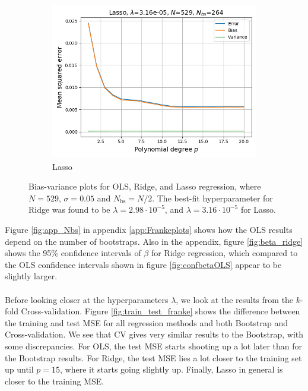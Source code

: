 \documentclass[a4paper]{article}
\begin{document}
\begin{figure}[H]
\begin{subfigure}{0.49\textwidth}
    \includegraphics[scale=0.45]{../figures/task_e/bias_variance_N529_pmax20_nlamb15_noise0.05_seed4155_Lasso_boot_Nbs264_opt1.png}
    \caption{Lasso}
  \end{subfigure}
  \caption{Bias-variance plots for OLS, Ridge, and Lasso regression, where $N=529$, $\sigma = 0.05$ and $N_{\text{bs}} = N/2$. The best-fit hyperparameter for Ridge was found to be $\lambda = 2.98\cdot10^{-5}$, and $\lambda = 3.16\cdot10^{-5}$ for Lasso.}
  \label{fig:bias_var}
\end{figure}
Figure \ref{fig:app_Nbs} in appendix \ref{app:Frankeplots} shows how the OLS results depend on the number of bootstraps. Also in the appendix, figure \ref{fig:beta_ridge} shows the 95\% confidence intervals of $\beta$ for Ridge regression, which compared to the OLS confidence intervals shown in figure \ref{fig:confbetaOLS} appear to be slightly larger.\\\\
Before looking closer at the hyperparameters $\lambda$, we look at the results from the $k$-fold Cross-validation. Figure \ref{fig:train_test_franke} shows the difference between the training and test MSE for all regression methods and both Bootstrap and Cross-validation. We see that CV gives very similar results to the Bootstrap, with some discrepancies. For OLS, the test MSE starts shooting up a lot later than for the Bootstrap results. For Ridge, the test MSE lies a lot closer to the training set up until $p=15$, where it starts going slightly up. Finally, Lasso in general is closer to the training MSE.
\end{document}
